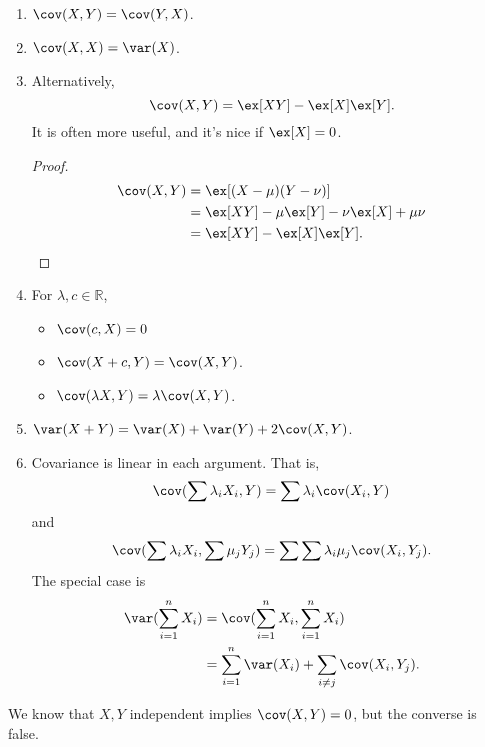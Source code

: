 \begin{property}
    \begin{enumerate}
        \item \(\cov(X,Y) = \cov(Y, X)\).
        \item \(\cov(X, X) = \var(X)\).
        \item Alternatively,
        \[
            \cov(X, Y) = \ex[XY] - \ex[X]\ex[Y].
        \]
        It is often more useful, and it's nice if \(\ex[X] = 0\).
        \begin{proof}
            \begin{align*}
                \cov(X,Y) &= \ex[(X - \mu)(Y - \nu)]\\
                &= \ex[XY] - \mu\ex[Y] - \nu\ex[X] + \mu\nu\\
                &= \ex[XY] - \ex[X]\ex[Y].
            \end{align*}
        \end{proof}
        \item For \(\lambda, c \in \mathbb{R}\),
        \begin{itemize}
            \item \(\cov(c, X) = 0\)
            \item \(\cov(X + c, Y) = \cov(X, Y)\).
            \item \(\cov(\lambda X, Y) = \lambda\cov(X, Y)\).
        \end{itemize}
        \item \(\var(X + Y) = \var(X) + \var(Y) + 2 \cov(X, Y)\).
        \item Covariance is linear in each argument. That is,
        \[
            \cov(\sum \lambda_i X_i, Y) = \sum \lambda_i \cov(X_i,Y)
        \]
        and
        \[
            \cov(\sum \lambda_i X_i, \sum \mu_j Y_j) = \sum\sum \lambda_i \mu_j\cov(X_i,Y_j).
        \]
        The special case is
        \begin{align*}
            \var(\sum_{i =1}^n X_i) &= \cov(\sum_{i = 1}^n X_i, \sum_{i=1}^n X_i)\\
            &= \sum_{i=1}^n \var(X_i) + \sum_{i\neq j}\cov(X_i, Y_j).
        \end{align*}
    \end{enumerate}
\end{property}
\begin{remark}
    We know that \(X, Y\) independent implies \(\cov(X, Y) = 0\), but the converse is false.
\end{remark}